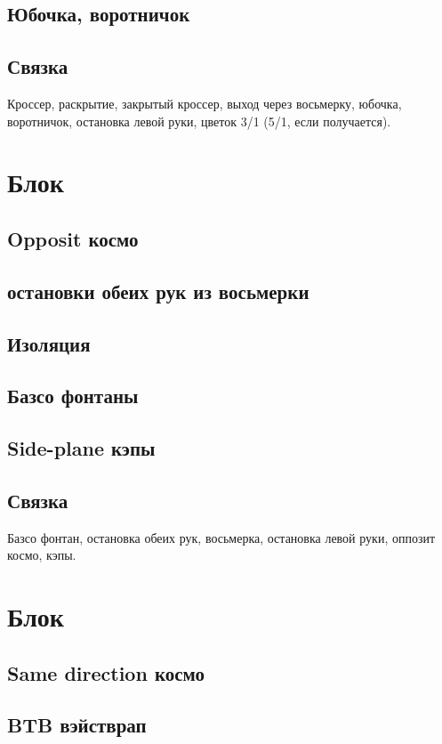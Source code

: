 \documentclass[a4paper, 12pt]{article}
\begin{document}
	\subsection{Юбочка, воротничок}
	\subsection{Связка}
	Кроссер, раскрытие, закрытый кроссер, выход через восьмерку, юбочка, воротничок, остановка левой руки, цветок 3/1 (5/1, если получается).
	
	\section{Блок}
	
	\subsection{Opposit космо}
	\subsection{остановки обеих рук из восьмерки}
	\subsection{Изоляция}
	\subsection{Базсо фонтаны}
	\subsection{Side-plane кэпы}
	\subsection{Связка}
	Базсо фонтан, остановка обеих рук, восьмерка, остановка левой руки, оппозит космо, кэпы.
	
	\section{Блок}
	
	\subsection{Same direction космо}
	\subsection{BTB вэйстврап}
\end{document}

